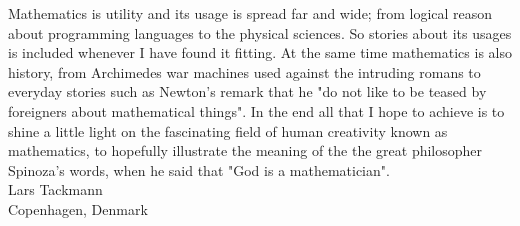 \indent Mathematics is utility and its usage is spread far and wide; from logical reason about programming languages to the physical sciences. So stories about its usages is included whenever I have found it fitting. At the same time mathematics is also history, from Archimedes war machines used against the intruding romans to everyday stories such as Newton's remark that he "do not like to be teased by foreigners about mathematical things". In the end all that I hope to achieve is to shine a little light on the fascinating field of human creativity known as mathematics, to hopefully illustrate the meaning of the the great philosopher Spinoza's words, when he said that "God is a mathematician". \\
\flushright Lars Tackmann \\ Copenhagen, Denmark\flushleft

